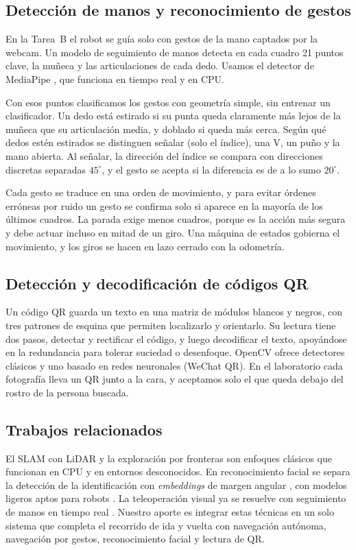 \documentclass[11pt,a4paper]{article}
\begin{document}
\subsection{Detección de manos y reconocimiento de gestos}

En la Tarea~B el robot se guía solo con gestos de la mano captados por la webcam. Un modelo de seguimiento de manos detecta en cada cuadro 21 puntos clave, la muñeca y las articulaciones de cada dedo. Usamos el detector de MediaPipe \cite{zhang2020mediapipehands}, que funciona en tiempo real y en CPU.

Con esos puntos clasificamos los gestos con geometría simple, sin entrenar un clasificador. Un dedo está estirado si su punta queda claramente más lejos de la muñeca que su articulación media, y doblado si queda más cerca. Según qué dedos estén estirados se distinguen señalar (solo el índice), una V, un puño y la mano abierta. Al señalar, la dirección del índice se compara con direcciones discretas separadas $45^\circ$, y el gesto se acepta si la diferencia es de a lo sumo $20^\circ$.

Cada gesto se traduce en una orden de movimiento, y para evitar órdenes erróneas por ruido un gesto se confirma solo si aparece en la mayoría de los últimos cuadros. La parada exige menos cuadros, porque es la acción más segura y debe actuar incluso en mitad de un giro. Una máquina de estados gobierna el movimiento, y los giros se hacen en lazo cerrado con la odometría.

\subsection{Detección y decodificación de códigos QR}

Un código QR guarda un texto en una matriz de módulos blancos y negros, con tres patrones de esquina que permiten localizarlo y orientarlo. Su lectura tiene dos pasos, detectar y rectificar el código, y luego decodificar el texto, apoyándose en la redundancia para tolerar suciedad o desenfoque. OpenCV ofrece detectores clásicos y uno basado en redes neuronales (WeChat QR). En el laboratorio cada fotografía lleva un QR junto a la cara, y aceptamos solo el que queda debajo del rostro de la persona buscada.

\subsection{Trabajos relacionados}

El SLAM con LiDAR \cite{thrun2005} y la exploración por fronteras \cite{yamauchi1997} son enfoques clásicos que funcionan en CPU y en entornos desconocidos. En reconocimiento facial se separa la detección \cite{wu2023yunet} de la identificación con \textit{embeddings} de margen angular \cite{deng2019arcface}, con modelos ligeros aptos para robots \cite{chen2018mobilefacenets}. La teleoperación visual ya se resuelve con seguimiento de manos en tiempo real \cite{zhang2020mediapipehands}. Nuestro aporte es integrar estas técnicas en un solo sistema que completa el recorrido de ida y vuelta con navegación autónoma, navegación por gestos, reconocimiento facial y lectura de QR.
\end{document}
